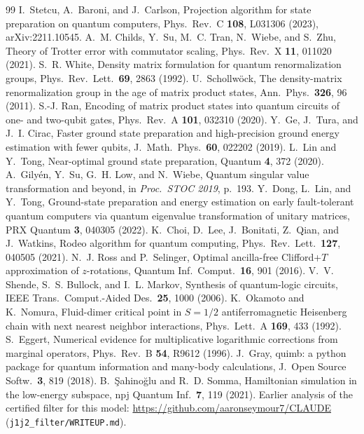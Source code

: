 \documentclass[aps,pra,twocolumn,superscriptaddress,nofootinbib]{revtex4-2}
\begin{document}
\begin{thebibliography}{99}
 I.~Stetcu, A.~Baroni, and J.~Carlson, Projection algorithm for state preparation on
  quantum computers, Phys.\ Rev.\ C \textbf{108}, L031306 (2023), arXiv:2211.10545.
 A.~M. Childs, Y.~Su, M.~C. Tran, N.~Wiebe, and S.~Zhu, Theory of Trotter error with
  commutator scaling, Phys.\ Rev.\ X \textbf{11}, 011020 (2021).
 S.~R. White, Density matrix formulation for quantum renormalization groups,
  Phys.\ Rev.\ Lett.\ \textbf{69}, 2863 (1992).
 U.~Schollw\"ock, The density-matrix renormalization group in the age of matrix
  product states, Ann.\ Phys.\ \textbf{326}, 96 (2011).
 S.-J. Ran, Encoding of matrix product states into quantum circuits of one- and
  two-qubit gates, Phys.\ Rev.\ A \textbf{101}, 032310 (2020).
 Y.~Ge, J.~Tura, and J.~I. Cirac, Faster ground state preparation and high-precision
  ground energy estimation with fewer qubits, J.\ Math.\ Phys.\ \textbf{60}, 022202 (2019).
 L.~Lin and Y.~Tong, Near-optimal ground state preparation, Quantum \textbf{4}, 372
  (2020).
 A.~Gily\'en, Y.~Su, G.~H. Low, and N.~Wiebe, Quantum singular value transformation
  and beyond, in \emph{Proc.\ STOC 2019}, p.~193.
 Y.~Dong, L.~Lin, and Y.~Tong, Ground-state preparation and energy estimation on
  early fault-tolerant quantum computers via quantum eigenvalue transformation of unitary matrices,
  PRX Quantum \textbf{3}, 040305 (2022).
 K.~Choi, D.~Lee, J.~Bonitati, Z.~Qian, and J.~Watkins, Rodeo algorithm for quantum
  computing, Phys.\ Rev.\ Lett.\ \textbf{127}, 040505 (2021).
 N.~J. Ross and P.~Selinger, Optimal ancilla-free Clifford+$T$ approximation of
  $z$-rotations, Quantum Inf.\ Comput.\ \textbf{16}, 901 (2016).
 V.~V. Shende, S.~S. Bullock, and I.~L. Markov, Synthesis of quantum-logic circuits,
  IEEE Trans.\ Comput.-Aided Des.\ \textbf{25}, 1000 (2006).
 K.~Okamoto and K.~Nomura, Fluid-dimer critical point in $S=1/2$ antiferromagnetic
  Heisenberg chain with next nearest neighbor interactions, Phys.\ Lett.\ A \textbf{169}, 433 (1992).
 S.~Eggert, Numerical evidence for multiplicative logarithmic corrections from
  marginal operators, Phys.\ Rev.\ B \textbf{54}, R9612 (1996).
 J.~Gray, quimb: a python package for quantum information and many-body calculations,
  J.\ Open Source Softw.\ \textbf{3}, 819 (2018).
 B.~\c{S}ahino\u{g}lu and R.~D. Somma, Hamiltonian simulation in the low-energy
  subspace, npj Quantum Inf.\ \textbf{7}, 119 (2021).
 Earlier analysis of the certified filter for this model:
  \url{https://github.com/aaronseymour7/CLAUDE} (\texttt{j1j2\_filter/WRITEUP.md}).
\end{thebibliography}
\end{document}
